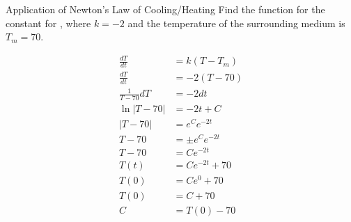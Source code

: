 \begin{example}[]{Application of Newton's Law of Cooling/Heating}
  Find the function for the constant for , where $k = -2$ and the temperature of the surrounding medium is $T_{m} = 70$.

  \tcblower

  \begin{align*}
    \frac{dT}{dt} &= k \left( T - T_{m} \right) \\
    \frac{dT}{dt} &= -2 \left( T - 70 \right) \\
    \frac{1}{T-70} dT &= -2 dt \\
    \ln \lvert T-70 \rvert &= -2t + C \\
    \lvert T-70 \rvert &= e^{C}e^{-2t} \\
    T-70 &= \pm e^{C}e^{-2t} \\
    T-70 &= Ce^{-2t} \\
    T \left( t \right) &= Ce^{-2t} +70 \\
    T \left( 0 \right) &= C e^{0} +70 \\
    T \left( 0 \right) &= C + 70 \\
    C &= T \left( 0 \right) -70 \\
  \end{align*}
\end{example}

